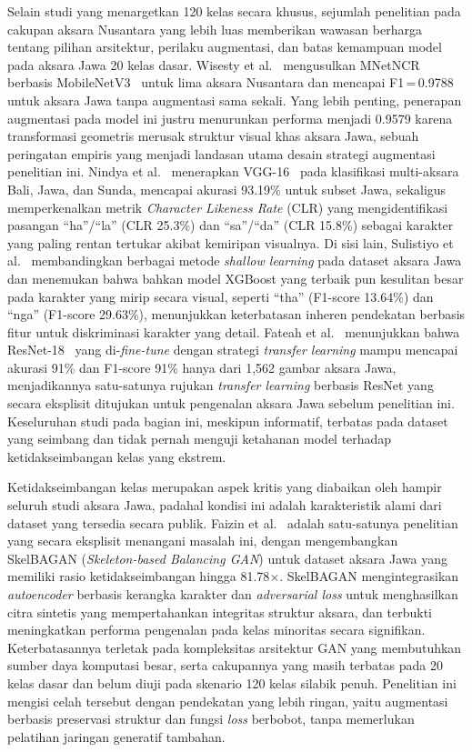 \documentclass[conference]{IEEEtran}
\begin{document}
Selain studi yang menargetkan 120 kelas secara khusus, sejumlah
penelitian pada cakupan aksara Nusantara yang lebih luas memberikan
wawasan berharga tentang pilihan arsitektur, perilaku augmentasi,
dan batas kemampuan model pada aksara Jawa 20 kelas dasar.
Wisesty et al.~\cite{wisesty2026} mengusulkan MNetNCR berbasis
MobileNetV3~\cite{howard2019mobilenetv3} untuk lima aksara Nusantara
dan mencapai F1\,=\,0.9788 untuk aksara Jawa tanpa augmentasi sama
sekali.
Yang lebih penting, penerapan augmentasi pada model ini justru
menurunkan performa menjadi 0.9579 karena transformasi geometris
merusak struktur visual khas aksara Jawa, sebuah peringatan empiris
yang menjadi landasan utama desain strategi augmentasi penelitian ini.
Nindya et al.~\cite{nindya2025} menerapkan VGG-16~\cite{simonyan2015vgg}
pada klasifikasi multi-aksara Bali, Jawa, dan Sunda, mencapai akurasi
93.19\% untuk subset Jawa, sekaligus memperkenalkan metrik
\textit{Character Likeness Rate} (CLR) yang mengidentifikasi pasangan
``ha''/``la'' (CLR 25.3\%) dan ``sa''/``da'' (CLR 15.8\%) sebagai
karakter yang paling rentan tertukar akibat kemiripan visualnya.
Di sisi lain, Sulistiyo et al.~\cite{sulistiyo2025} membandingkan
berbagai metode \textit{shallow learning} pada dataset aksara Jawa dan
menemukan bahwa bahkan model XGBoost yang terbaik pun kesulitan besar
pada karakter yang mirip secara visual, seperti ``tha''
(F1-score 13.64\%) dan ``nga'' (F1-score 29.63\%), menunjukkan
keterbatasan inheren pendekatan berbasis fitur untuk diskriminasi
karakter yang detail.
Fateah et al.~\cite{ifriza2026} menunjukkan bahwa ResNet-18~%
\cite{he2016resnet} yang di-\textit{fine-tune} dengan strategi
\textit{transfer learning} mampu mencapai akurasi 91\% dan
F1-score 91\% hanya dari 1,562 gambar aksara Jawa, menjadikannya satu-satunya rujukan \textit{transfer learning}
berbasis ResNet yang secara eksplisit ditujukan untuk pengenalan
aksara Jawa sebelum penelitian ini.
Keseluruhan studi pada bagian ini, meskipun informatif, terbatas
pada dataset yang seimbang dan tidak pernah menguji ketahanan model
terhadap ketidakseimbangan kelas yang ekstrem.

Ketidakseimbangan kelas merupakan aspek kritis yang diabaikan oleh
hampir seluruh studi aksara Jawa, padahal kondisi ini adalah
karakteristik alami dari dataset yang tersedia secara publik.
Faizin et al.~\cite{faizin2025} adalah satu-satunya penelitian yang
secara eksplisit menangani masalah ini, dengan mengembangkan SkelBAGAN
(\textit{Skeleton-based Balancing GAN}) untuk dataset aksara Jawa
yang memiliki rasio ketidakseimbangan hingga 81.78$\times$.
SkelBAGAN mengintegrasikan \textit{autoencoder} berbasis kerangka
karakter dan \textit{adversarial loss} untuk menghasilkan citra
sintetis yang mempertahankan integritas struktur aksara, dan terbukti
meningkatkan performa pengenalan pada kelas minoritas secara
signifikan.
Keterbatasannya terletak pada kompleksitas arsitektur GAN yang
membutuhkan sumber daya komputasi besar, serta cakupannya yang
masih terbatas pada 20 kelas dasar dan belum diuji pada skenario
120 kelas silabik penuh.
Penelitian ini mengisi celah tersebut dengan pendekatan yang lebih
ringan, yaitu augmentasi berbasis preservasi struktur dan fungsi
\textit{loss} berbobot, tanpa memerlukan pelatihan jaringan generatif
tambahan.
\end{document}
